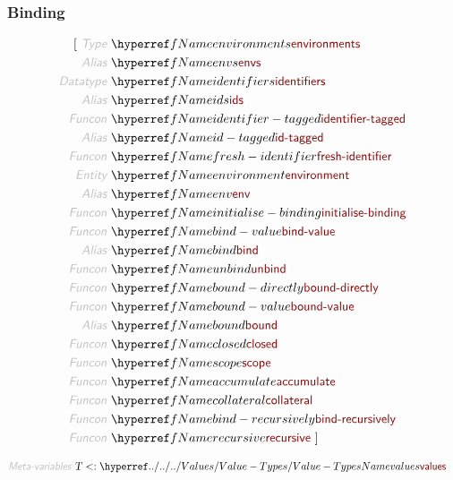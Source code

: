 \subsubsection*{Binding}\hypertarget{binding}{}\label{binding}

\begin{displaymath}
\relax\begin{aligned}\relax
  [ ~ 
  \KEY{Type} ~ & \NAMEREF{environments} \\
  \KEY{Alias} ~ & \NAMEREF{envs} \\
  \KEY{Datatype} ~ & \NAMEREF{identifiers} \\
  \KEY{Alias} ~ & \NAMEREF{ids} \\
  \KEY{Funcon} ~ & \NAMEREF{identifier-tagged} \\
  \KEY{Alias} ~ & \NAMEREF{id-tagged} \\
  \KEY{Funcon} ~ & \NAMEREF{fresh-identifier} \\
  \KEY{Entity} ~ & \NAMEREF{environment} \\
  \KEY{Alias} ~ & \NAMEREF{env} \\
  \KEY{Funcon} ~ & \NAMEREF{initialise-binding} \\
  \KEY{Funcon} ~ & \NAMEREF{bind-value} \\
  \KEY{Alias} ~ & \NAMEREF{bind} \\
  \KEY{Funcon} ~ & \NAMEREF{unbind} \\
  \KEY{Funcon} ~ & \NAMEREF{bound-directly} \\
  \KEY{Funcon} ~ & \NAMEREF{bound-value} \\
  \KEY{Alias} ~ & \NAMEREF{bound} \\
  \KEY{Funcon} ~ & \NAMEREF{closed} \\
  \KEY{Funcon} ~ & \NAMEREF{scope} \\
  \KEY{Funcon} ~ & \NAMEREF{accumulate} \\
  \KEY{Funcon} ~ & \NAMEREF{collateral} \\
  \KEY{Funcon} ~ & \NAMEREF{bind-recursively} \\
  \KEY{Funcon} ~ & \NAMEREF{recursive}
  ~ ]
\end{aligned}
\end{displaymath}

\begin{displaymath}
\relax\begin{aligned}\relax
  \KEY{Meta-variables} ~ 
  & \VAR{T} <: \NAMEHYPER{../../../Values}{Value-Types}{values}
\end{aligned}
\end{displaymath}

